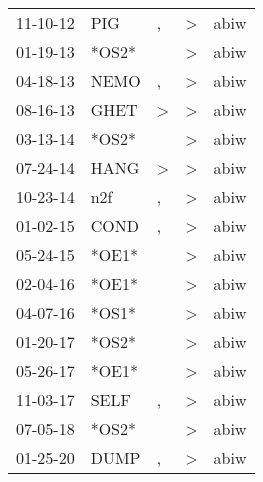 \begin{supertabular}{lllll}
 11-10-12 &    PIG &             , &     \textgreater &   abiw \\
 01-19-13 &  *OS2* &               &     \textgreater &   abiw \\
 04-18-13 &   NEMO &             , &     \textgreater &   abiw \\
 08-16-13 &   GHET &  \textgreater &     \textgreater &   abiw \\
 03-13-14 &  *OS2* &               &     \textgreater &   abiw \\
 07-24-14 &   HANG &  \textgreater &     \textgreater &   abiw \\
 10-23-14 &    n2f &             , &     \textgreater &   abiw \\
 01-02-15 &   COND &             , &     \textgreater &   abiw \\
 05-24-15 &  *OE1* &               &     \textgreater &   abiw \\
 02-04-16 &  *OE1* &               &     \textgreater &   abiw \\
 04-07-16 &  *OS1* &               &     \textgreater &   abiw \\
 01-20-17 &  *OS2* &               &     \textgreater &   abiw \\
 05-26-17 &  *OE1* &               &     \textgreater &   abiw \\
 11-03-17 &   SELF &             , &     \textgreater &   abiw \\
 07-05-18 &  *OS2* &               &     \textgreater &   abiw \\
 01-25-20 &   DUMP &             , &     \textgreater &   abiw \\
\end{supertabular}
